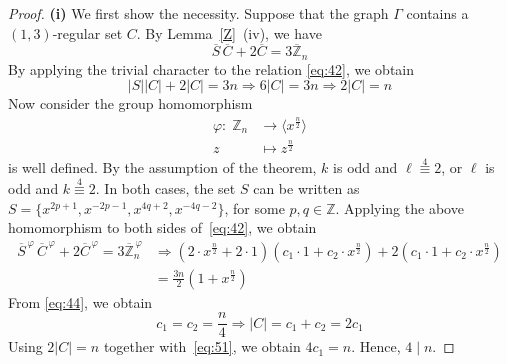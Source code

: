 \documentclass[12pt]{article}
\begin{document}
   \begin{proof}
\textbf{(i)} We first show the necessity. Suppose that the graph $\Gamma$ contains a $(1,3)$-regular set $C$. By Lemma~\ref{Z}~(iv), we have
\begin{equation}\label{eq:42}
	\overline{S}\,\overline{C}+2\overline{C}
	=3\overline{\mathbb{Z}}_{n}
\end{equation}
 By applying the trivial character to the relation \eqref{eq:42}, we obtain
\[
|S||C|+2|C|=3n \Longrightarrow 6|C|=3n  \Longrightarrow 2|C|=n
\]
Now consider the group homomorphism	\[
\begin{aligned}
	\varphi :\; \mathbb{Z}_n &\to \langle x^{\frac{n}{2}} \rangle \\
	z &\mapsto z^{\frac{n}{2}}
\end{aligned}
\]
is well defined. By the assumption of the theorem, $k$ is odd and $\ell\stackrel{4}{\equiv}2$, or $\ell$ is odd and $k\stackrel{4}{\equiv}2$. In both cases, the set $S$ can be written as
$S=\{x^{2p+1},x^{-2p-1},x^{4q+2},x^{-4q-2}\}$,
for some $p,q\in\mathbb{Z}$. Applying the above homomorphism to both sides of~\eqref{eq:42}, we obtain
\begin{equation}\label{eq:44}
	\begin{aligned}
		\overline{S}^{\,\varphi}\,\overline{C}^{\,\varphi}+2\overline{C}^{\,\varphi} =
		3\overline{\mathbb{Z}}_{n}^{\,\varphi}
		&\Longrightarrow
		\left(2\cdot x^{\frac{n}{2}}+2\cdot 1 \right)\left(c_1\cdot 1+c_2\cdot x^{\frac{n}{2}}\right)
		+2\left(c_1\cdot 1+c_2\cdot x^{\frac{n}{2}}\right) \\
		&=
		\frac{3n}{2}\left(1+x^{\frac{n}{2}}\right)
	\end{aligned}
\end{equation}
From \eqref{eq:44}, we obtain
\begin{equation}\label{eq:51}
	c_1=c_2=\frac{n}{4}
	\Longrightarrow
	|C|=c_1+c_2=2c_1
\end{equation}
 Using \(2|C|=n\) together with~\eqref{eq:51}, we obtain
	$4c_1=n$.
Hence, $4\mid n$.


\end{proof}
\end{document}
